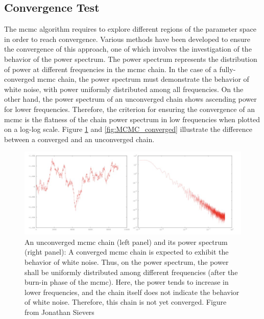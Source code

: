 \documentclass[12pt, TexShade, letterpaper]{report}
\begin{document}
\subsection{Convergence Test}
\label{chap:method,sub:mcmc,subsub:convergence}
The \gls{mcmc} algorithm requires to explore different regions of the parameter space in order to reach convergence. Various methods have been developed to ensure the convergence of this approach, one of which involves the investigation of the behavior of the power spectrum. The power spectrum represents the distribution of power at different frequencies in the \gls{mcmc} chain. In the case of a fully-converged \gls{mcmc} chain, the power spectrum must demonstrate the behavior of white noise, with power uniformly distributed among all frequencies. On the other hand, the power spectrum of an unconverged chain shows ascending power for lower frequencies. Therefore, the criterion for ensuring the convergence of an \gls{mcmc} is the flatness of the chain power spectrum in low frequencies when plotted on a log-log scale. Figure \ref{fig:MCMC_unconverged} and \ref{fig:MCMC_converged} illustrate the difference between a converged and an unconverged chain.\par
\begin{figure}[h!]
\centering
\includegraphics[scale =0.9]{mcmc_uncoverged.jpg}
\caption[An unconverged \gls{mcmc} chain and its power spectrum]{An unconverged \gls{mcmc} chain (left panel) and its power spectrum (right panel): A converged \gls{mcmc} chain is expected to exhibit the behavior of white noise. Thus, on the power spectrum, the power shall be uniformly distributed among different frequencies (after the burn-in phase of the \gls{mcmc}). Here, the power tends to increase in lower frequencies, and the chain itself does not indicate the behavior of white noise. Therefore, this chain is not yet converged. Figure from Jonathan Sievers \cite{mcmc_convergence_plot}}
\label{fig:MCMC_unconverged}
\end{figure}
\end{document}
